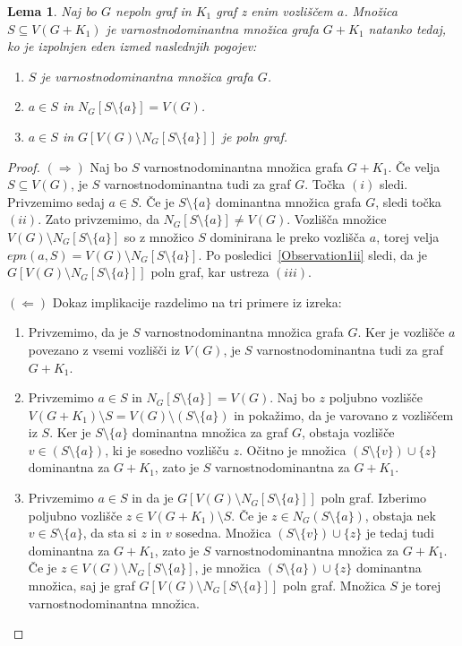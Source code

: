 \documentclass[12pt,a4paper,twoside]{article}
\theoremstyle{definition} %
\theoremstyle{plain} %
\newtheorem{lema}[definicija]{Lema}
\numberwithin{equation}{section}  %
\begin{document}
\begin{lema}\label{lemaSpojZVozliščem}{\rm{\cite[Corollary 2.8]{castillano2014secure}}}
Naj bo $G$ nepoln graf in $K_1$ graf z enim vozliščem $a$. Množica $S \subseteq V( G + K_1)$ je varnostnodominantna množica grafa $G + K_1$ natanko tedaj, ko je izpolnjen eden izmed naslednjih pogojev:
\begin{enumerate}[label=(\roman*)]
\item $S$ je varnostnodominantna množica grafa $G$.
\item $a \in S$ in $N_G[S \setminus \{a\}] = V(G)$.
\item $a \in S$ in $G[V(G) \setminus N_G[S \setminus \{a\}]]$ je poln graf.
\end{enumerate}
\end{lema}
\begin{proof}
$(\Rightarrow)$  Naj bo $S$ varnostnodominantna množica grafa $G + K_1$. Če velja $S \subseteq V(G)$, je $S$ varnostnodominantna tudi za graf $G$. Točka $(i)$ sledi. Privzemimo sedaj $a \in S$. Če je $S \setminus \{a\}$ dominantna množica grafa $G$, sledi točka $(ii)$. Zato privzemimo, da $N_G[S \setminus \{a\}] \neq V(G)$. Vozlišča množice $V(G) \setminus N_G[S \setminus \{a\}]$ so z množico $S$ dominirana le preko vozlišča $a$, torej velja $epn(a, S) = V(G) \setminus N_G[S \setminus \{a\}]$.  Po posledici~\ref{Observation1ii} sledi, da je $G[V(G) \setminus N_G[S \setminus \{a\}]]$ poln graf, kar ustreza $(iii)$.

\medskip
\noindent
$(\Leftarrow)$ Dokaz implikacije razdelimo na tri primere iz izreka:
\begin{enumerate}[label=($\roman*$)]
\item Privzemimo, da je $S$ varnostnodominantna množica grafa $G$. Ker je vozlišče $a$ povezano z vsemi vozlišči iz $V(G)$, je $S$ varnostnodominantna tudi za graf $G + K_1$.
\item Privzemimo $a \in S$ in $N_G[S \setminus \{a\}] = V(G)$. Naj bo $z$ poljubno vozlišče $V(G + K_1) \setminus S = V(G) \setminus (S \setminus \{a\})$ in pokažimo, da je varovano z vozliščem iz $S$. Ker je $S \setminus \{a\}$ dominantna množica za graf $G$, obstaja vozlišče $v \in (S \setminus \{a\})$, ki je sosedno vozlišču $z$. Očitno je množica $(S \setminus \{v\}) \cup \{z\}$ dominantna za $G + K_1$, zato je $S$ varnostnodominantna za $G + K_1$.
\item Privzemimo $a \in S$ in da je $G[V(G) \setminus N_G[S \setminus \{a\}]]$ poln graf. Izberimo poljubno vozlišče $z \in V(G + K_1) \setminus S$. Če je $z \in N_G(S \setminus \{a\})$,  obstaja nek $v\in S \setminus \{a\}$, da sta si $z$ in $v$ sosedna. Množica $(S \setminus \{v\}) \cup \{z\}$ je tedaj tudi dominantna za $G + K_1$, zato je $S$ varnostnodominantna množica za $G + K_1$. Če je $z \in V(G) \setminus N_G[S \setminus \{a\}]$, je množica $(S \setminus \{a\}) \cup \{z\}$ dominantna množica, saj je graf $G[V(G) \setminus N_G[S \setminus \{a\}]]$ poln graf. Množica $S$ je torej varnostnodominantna množica. \qedhere
\end{enumerate}
\end{proof}
\end{document}
